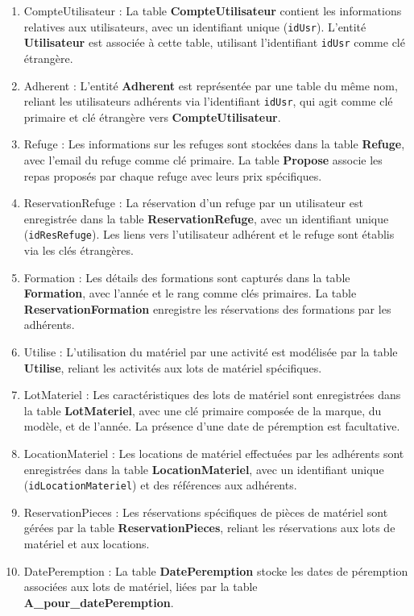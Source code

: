 \begin{enumerate}
     


\item    CompteUtilisateur : La table \textbf{CompteUtilisateur} contient les informations relatives aux utilisateurs, avec un identifiant unique (\texttt{idUsr}). L'entité \textbf{Utilisateur} est associée à cette table, utilisant l'identifiant \texttt{idUsr} comme clé étrangère.

\item    Adherent : L'entité \textbf{Adherent} est représentée par une table du même nom, reliant les utilisateurs adhérents via l'identifiant \texttt{idUsr}, qui agit comme clé primaire et clé étrangère vers \textbf{CompteUtilisateur}.

 \item   Refuge : Les informations sur les refuges sont stockées dans la table \textbf{Refuge}, avec l'email du refuge comme clé primaire. La table \textbf{Propose} associe les repas proposés par chaque refuge avec leurs prix spécifiques.

\item    ReservationRefuge : La réservation d'un refuge par un utilisateur est enregistrée dans la table \textbf{ReservationRefuge}, avec un identifiant unique (\texttt{idResRefuge}). Les liens vers l'utilisateur adhérent et le refuge sont établis via les clés étrangères.

\item    Formation : Les détails des formations sont capturés dans la table \textbf{Formation}, avec l'année et le rang comme clés primaires. La table \textbf{ReservationFormation} enregistre les réservations des formations par les adhérents.

\item    Utilise : L'utilisation du matériel par une activité est modélisée par la table \textbf{Utilise}, reliant les activités aux lots de matériel spécifiques.

\item    LotMateriel : Les caractéristiques des lots de matériel sont enregistrées dans la table \textbf{LotMateriel}, avec une clé primaire composée de la marque, du modèle, et de l'année. La présence d'une date de péremption est facultative.

\item    LocationMateriel : Les locations de matériel effectuées par les adhérents sont enregistrées dans la table \textbf{LocationMateriel}, avec un identifiant unique (\texttt{idLocationMateriel}) et des références aux adhérents.

\item    ReservationPieces : Les réservations spécifiques de pièces de matériel sont gérées par la table \textbf{ReservationPieces}, reliant les réservations aux lots de matériel et aux locations.

\item    DatePeremption : La table \textbf{DatePeremption} stocke les dates de péremption associées aux lots de matériel, liées par la table \textbf{A\_pour\_datePeremption}.
\end{enumerate}
